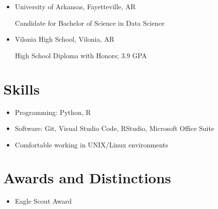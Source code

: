 \documentclass[
  11pt,
]{article}
\providecommand{\tightlist}{%
  \setlength{\itemsep}{0pt}\setlength{\parskip}{0pt}}
\begin{document}
\begin{itemize}
\item
  University of Arkansas, Fayetteville, AR

  Candidate for Bachelor of Science in Data Science
\item
  Vilonia High School, Vilonia, AR

  High School Diploma with Honors; 3.9 GPA
\end{itemize}

\hypertarget{skills}{%
\section{Skills}\label{skills}}

\begin{itemize}
\tightlist
\item
  Programming: Python, R
\item
  Software: Git, Visual Studio Code, RStudio, Microsoft Office Suite
\item
  Comfortable working in UNIX/Linux environments
\end{itemize}

\hypertarget{awards-and-distinctions}{%
\section{Awards and Distinctions}\label{awards-and-distinctions}}

\begin{itemize}
\tightlist
\item
  Eagle Scout Award
\end{itemize}
\end{document}
